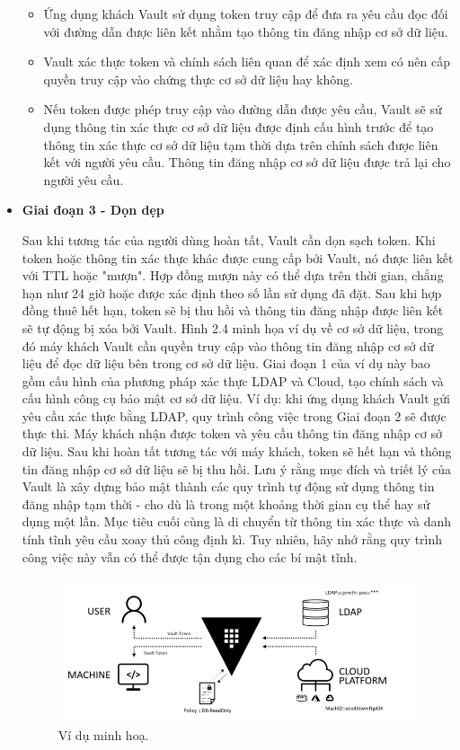 \documentclass[12pt,a4paper]{report}
\begin{document}
\begin{itemize}
\begin{itemize}
			\item {Ứng dụng khách Vault sử dụng token truy cập để đưa ra yêu cầu đọc đối với đường dẫn được liên kết nhằm tạo thông tin đăng nhập cơ sở dữ liệu.}
			\item {Vault xác thực token và chính sách liên quan để xác định xem có nên cấp quyền truy cập vào chứng thực cơ sở dữ liệu hay không.}
			\item {Nếu token được phép truy cập vào đường dẫn được yêu cầu, Vault sẽ sử dụng thông tin xác thực cơ sở dữ liệu được định cấu hình trước để tạo thông tin xác thực cơ sở dữ liệu tạm thời dựa trên chính sách được liên kết với người yêu cầu. Thông tin đăng nhập cơ sở dữ liệu được trả lại cho người yêu cầu.}
		\end{itemize}
		\item \textbf{Giai đoạn 3 - Dọn dẹp}
		\smallskip

		\subitem Sau khi tương tác của người dùng hoàn tất, Vault cần dọn sạch token. Khi token hoặc thông tin xác thực khác được cung cấp bởi Vault, nó được liên kết với TTL hoặc "mượn". Hợp đồng mượn này có thể dựa trên thời gian, chẳng hạn như 24 giờ hoặc được xác định theo số lần sử dụng đã đặt. Sau khi hợp đồng thuê hết hạn, token sẽ bị thu hồi và thông tin đăng nhập được liên kết sẽ tự động bị xóa bởi Vault.
		\subitem Hình 2.4 minh họa ví dụ về cơ sở dữ liệu, trong đó máy khách Vault cần quyền truy cập vào thông tin đăng nhập cơ sở dữ liệu để đọc dữ liệu bên trong cơ sở dữ liệu. Giai đoạn 1 của ví dụ này bao gồm cấu hình của phương pháp xác thực LDAP và Cloud, tạo chính sách và cấu hình công cụ bảo mật cơ sở dữ liệu. Ví dụ: khi ứng dụng khách Vault gửi yêu cầu xác thực bằng LDAP, quy trình công việc trong Giai đoạn 2 sẽ được thực thi. Máy khách nhận được token và yêu cầu thông tin đăng nhập cơ sở dữ liệu. Sau khi hoàn tất tương tác với máy khách, token sẽ hết hạn và thông tin đăng nhập cơ sở dữ liệu sẽ bị thu hồi.
		\subitem Lưu ý rằng mục đích và triết lý của Vault là xây dựng bảo mật thành các quy trình tự động sử dụng thông tin đăng nhập tạm thời - cho dù là trong một khoảng thời gian cụ thể hay sử dụng một lần. Mục tiêu cuối cùng là di chuyển từ thông tin xác thực và danh tính tĩnh yêu cầu xoay thủ công định kì. Tuy nhiên, hãy nhớ rằng quy trình công việc này vẫn có thể được tận dụng cho các bí mật tĩnh.

		\begin{figure}[h]
			\centering
			\includegraphics[width=1\textwidth]{"Pics/clean_up"}
			\caption{\label{fig:clean_up} Ví dụ minh hoạ.}
			\label{fig:clean_up}
		\end{figure}
	\end{itemize}
\end{document}
